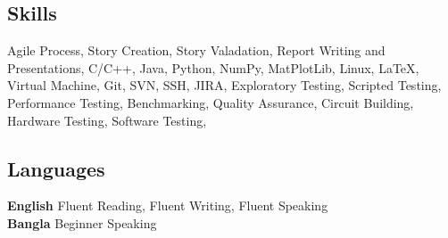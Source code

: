 \documentclass[10pt, twocolumn]{article}
\begin{document}
\subsection*{\color{draculapurple}Skills}
Agile Process,
Story Creation,
Story Valadation,
Report Writing and Presentations,
C/C++,
Java,
Python,
NumPy,
MatPlotLib,
Linux,
\LaTeX,
Virtual Machine,
Git,
SVN,
SSH,
JIRA,
Exploratory Testing,
Scripted Testing,
Performance Testing,
Benchmarking,
Quality Assurance,
Circuit Building,
Hardware Testing,
Software Testing,

\subsection*{\color{draculapurple}Languages}
\textbf{English} Fluent Reading, Fluent Writing, Fluent Speaking\\
\textbf{Bangla} Beginner Speaking
\end{document}

